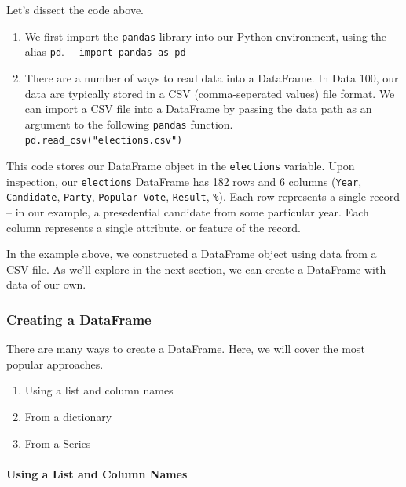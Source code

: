 \documentclass[
  letterpaper,
  DIV=11,
  numbers=noendperiod]{scrreprt}
\let\oldparagraph\paragraph
\renewcommand{\paragraph}[1]{\oldparagraph{#1}\mbox{}}
\providecommand{\tightlist}{%
  \setlength{\itemsep}{0pt}\setlength{\parskip}{0pt}}\usepackage{longtable,booktabs,array}
\begin{document}
Let's dissect the code above.

\begin{enumerate}
\def\labelenumi{\arabic{enumi}.}
\item
  We first import the \texttt{pandas} library into our Python
  environment, using the alias \texttt{pd}.
   \texttt{import\ pandas\ as\ pd}
\item
  There are a number of ways to read data into a DataFrame. In Data 100,
  our data are typically stored in a CSV (comma-seperated values) file
  format. We can import a CSV file into a DataFrame by passing the data
  path as an argument to the following \texttt{pandas} function.
   \texttt{pd.read\_csv("elections.csv")}
\end{enumerate}

This code stores our DataFrame object in the \texttt{elections}
variable. Upon inspection, our \texttt{elections} DataFrame has 182 rows
and 6 columns (\texttt{Year}, \texttt{Candidate}, \texttt{Party},
\texttt{Popular\ Vote}, \texttt{Result}, \texttt{\%}). Each row
represents a single record -- in our example, a presedential candidate
from some particular year. Each column represents a single attribute, or
feature of the record.

In the example above, we constructed a DataFrame object using data from
a CSV file. As we'll explore in the next section, we can create a
DataFrame with data of our own.

\hypertarget{creating-a-dataframe}{%
\subsubsection{Creating a DataFrame}\label{creating-a-dataframe}}

There are many ways to create a DataFrame. Here, we will cover the most
popular approaches.

\begin{enumerate}
\def\labelenumi{\arabic{enumi}.}
\tightlist
\item
  Using a list and column names
\item
  From a dictionary
\item
  From a Series
\end{enumerate}

\hypertarget{using-a-list-and-column-names}{%
\paragraph{Using a List and Column
Names}\label{using-a-list-and-column-names}}
\end{document}
